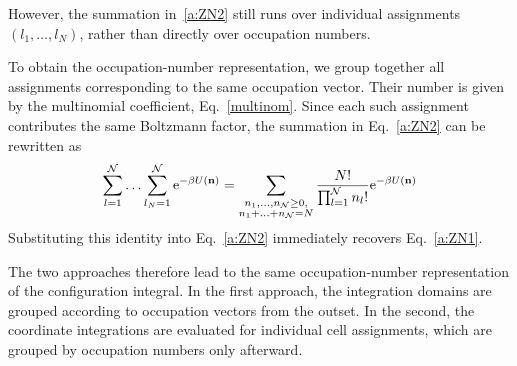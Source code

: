 \documentclass[12pt]{article}
\begin{document}
	However, the summation in~\eqref{a:ZN2} still runs over individual assignments $(l_1, \ldots, l_N)$, rather than directly over occupation numbers.
	
	To obtain the occupation-number representation, we group together all assignments corresponding to the same occupation vector. Their number is given by the multinomial coefficient, Eq.~\eqref{multinom}. Since each such assignment contributes the same Boltzmann factor, the summation in Eq.~\eqref{a:ZN2} can be rewritten as
	\begin{equation}
		\sum_{l=1}^{\mathcal{N}} \ldots \sum_{l_N=1}^{\mathcal{N}} {\rm e}^{-\beta U(\mathbf{n})} = \sum_{\substack{n_1, \ldots, n_{\mathcal{N}} \geq 0, \\ n_1 + \ldots + n_{\mathcal{N}} = N}} \frac{N!}{\prod_{l=1}^{\mathcal{N}} n_l!} {\rm e}^{-\beta U(\mathbf{n})}
	\end{equation}
	Substituting this identity into Eq.~\eqref{a:ZN2} immediately recovers Eq.~\eqref{a:ZN1}.
	
	The two approaches therefore lead to the same occupation-number representation of the configuration integral. In the first approach, the integration domains are grouped according to occupation vectors from the outset. In the second, the coordinate integrations are evaluated for individual cell assignments, which are grouped by occupation numbers only afterward.
	
	
	
	
	
	
\end{document}
